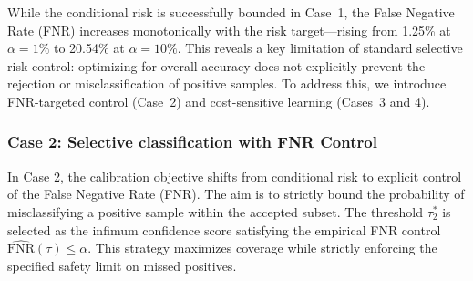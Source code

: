 \documentclass[journal,twoside,web]{ieeecolor}
\begin{document}
\begin{table}[htbp]
    \centering
    \caption{The selective classification performance of Case 1.}
    \label{tab:table5}
\end{table}

While the conditional risk is successfully bounded in Case~1, the False Negative Rate (FNR) increases monotonically with the risk target—rising from 1.25\% at $\alpha=1\%$ to 20.54\% at $\alpha=10\%$. This reveals a key limitation of standard selective risk control: optimizing for overall accuracy does not explicitly prevent the rejection or misclassification of positive samples. To address this, we introduce FNR-targeted control (Case~2) and cost-sensitive learning (Cases~3 and 4).

\subsubsection{\textbf{Case 2: Selective classification with FNR Control}}
\label{sec:case2_results}

In Case 2, the calibration objective shifts from conditional risk to explicit control of the False Negative Rate (FNR). The aim is to strictly bound the probability of misclassifying a positive sample within the accepted subset. The threshold $\tau_2^*$ is selected as the infimum confidence score satisfying the empirical FNR control $\widehat{\mathrm{FNR}}(\tau) \le \alpha$. This strategy maximizes coverage while strictly enforcing the specified safety limit on missed positives.

\begin{table}[htbp]
    \centering
    \caption{The selective classification performance of Case 2.}
    \label{tab:table6}
\end{table}
\end{document}
